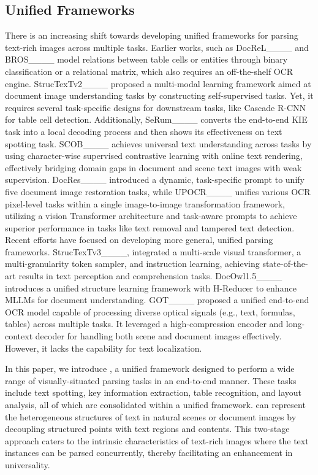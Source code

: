 \subsection{Unified Frameworks}
There is an increasing shift towards developing unified frameworks for parsing text-rich images across multiple tasks. Earlier works, such as DocReL____ and BROS____ model relations between table cells or entities through binary classification or a relational matrix, which also requires an off-the-shelf OCR engine.
StrucTexTv2____ proposed a multi-modal learning framework aimed at document image understanding tasks by constructing self-supervised tasks. Yet, it requires several task-specific designs for downstream tasks, like Cascade R-CNN for table cell detection. Additionally, SeRum____ converts the end-to-end KIE task into a local decoding process and then shows its effectiveness on text spotting task. SCOB____ achieves universal text understanding across tasks by using character-wise supervised contrastive learning with online text rendering, effectively bridging domain gaps in document and scene text images with weak supervision. DocRes____ introduced a dynamic, task-specific prompt to unify five document image restoration tasks, while UPOCR____ unifies various OCR pixel-level tasks within a single image-to-image transformation framework, utilizing a vision Transformer architecture and task-aware prompts to achieve superior performance in tasks like text removal and tampered text detection. Recent efforts have focused on developing more general, unified parsing frameworks. StrucTexTv3____, integrated a multi-scale visual transformer, a multi-granularity token sampler, and instruction learning, achieving state-of-the-art results in text perception and comprehension tasks. DocOwl1.5____ introduces a unified structure learning framework with H-Reducer to enhance MLLMs for document understanding. GOT____ proposed a unified end-to-end OCR model capable of processing diverse optical signals (e.g., text, formulas, tables) across multiple tasks. It leveraged a high-compression encoder and long-context decoder for handling both scene and document images effectively. However, it lacks the capability for text localization.


In this paper, we introduce \ourmodel, a unified framework designed to perform a wide range of visually-situated parsing tasks in an end-to-end manner. These tasks include text spotting, key information extraction, table recognition, and layout analysis, all of which are consolidated within a unified framework. 
\ourmodel can represent the heterogeneous structures of text in natural scenes or document images by decoupling structured points with text regions and contents. 
This two-stage approach caters to the intrinsic characteristics of text-rich images where the text instances can be parsed concurrently, thereby facilitating an enhancement in universality.


